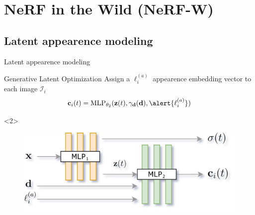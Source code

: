\documentclass[aspectratio=1610]{beamer}
\begin{document}
\section{NeRF in the Wild (NeRF-W)}

\subsection{Latent appearence modeling}
\begin{frame}{Latent appearence modeling}
    \begin{block}{Generative Latent Optimization}
        Assign a \(\ell_i^{(a)}\) 
        appearence embedding vector to each image \(\mathcal{I}_i\)
        \begin{equation*}
            \vb{c}_i(t) = \textrm{MLP}_{\theta_2} (\vb{z}(t), \gamma_{\vb{d}}(\vb{d}), \alert{\ell_i^{(a)}})
        \end{equation*}
    \end{block}
    \begin{onlyenv}<2>
        \bigskip
        \begin{figure}[H]
            \centering
            \includegraphics[width=.65\textwidth,keepaspectratio]{nerfa-architecture.png}
        \end{figure}
    \end{onlyenv}
\end{frame}
\end{document}
